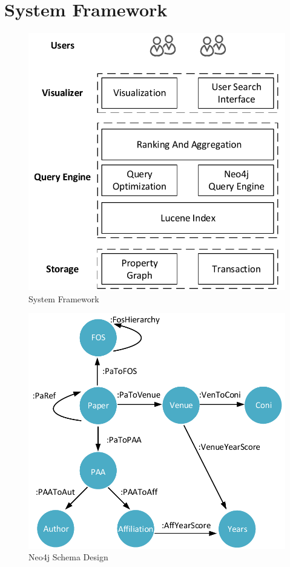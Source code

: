 \section{System Framework}
\label{sec-system}

\begin{figure}
\centering
\includegraphics[width=0.9\columnwidth]{systemFrame.pdf}
\caption{System Framework}
\label{fig:frame}
\vspace{-2ex}
\end{figure}


\begin{figure}
\centering
\includegraphics[width=0.5\columnwidth]{neo4jSchema.pdf}
\caption{Neo4j Schema Design}
\label{fig:schema}
\vspace{-3ex}
\end{figure}

